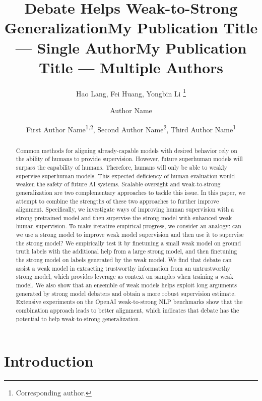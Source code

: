 \documentclass[letterpaper]{article} %
\title{Debate Helps Weak-to-Strong Generalization}
\author{
    Hao Lang,
    Fei Huang,
    Yongbin Li \thanks{Corresponding author.}
}
\title{My Publication Title --- Single Author}
\author {
    Author Name
}
\title{My Publication Title --- Multiple Authors}
\author {
    First Author Name\textsuperscript{\rm 1,\rm 2},
    Second Author Name\textsuperscript{\rm 2},
    Third Author Name\textsuperscript{\rm 1}
}
\begin{document}
\maketitle

\begin{abstract}
Common methods for aligning already-capable models with desired behavior rely on the ability of humans to provide supervision.
However, future superhuman models will surpass the capability of humans.
Therefore, humans will only be able to weakly supervise superhuman models.
This expected deficiency of human evaluation would weaken the safety of future AI systems.
Scalable oversight and weak-to-strong generalization are two complementary approaches to tackle this issue.
In this paper, we attempt to combine the strengths of these two approaches to further improve alignment.
Specifically, we investigate ways of improving human supervision with a strong pretrained model and then supervise the strong model with enhanced weak human supervision.
To make iterative empirical progress, we consider an analogy: can we use a strong model to improve weak model supervision and then use it to supervise the strong model?
We empirically test it by finetuning a small weak model on ground truth labels with the additional help from a large strong model, and then finetuning the strong model on labels generated by the weak model.
We find that debate can assist a weak model in extracting trustworthy information from an untrustworthy strong model, which provides leverage as context on samples when training a weak model.
We also show that an ensemble of weak models helps exploit long arguments generated by strong model debaters and obtain a more robust supervision estimate.
Extensive experiments on the OpenAI weak-to-strong NLP benchmarks show that the combination approach leads to better alignment, which indicates that debate has the potential to help weak-to-strong generalization.
\end{abstract}

%

\section{Introduction}
\end{document}
